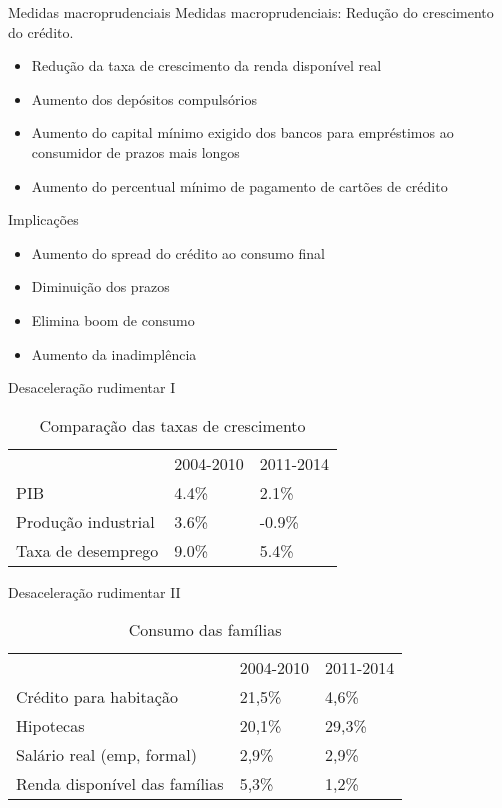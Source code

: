 \documentclass[presentation]{beamer}
\begin{document}
\begin{frame}[label={sec:orga8bc420}]{Medidas macroprudenciais}
\alert{Medidas macroprudenciais:} Redução do crescimento do crédito.

\begin{itemize}
\item Redução da taxa de crescimento da renda disponível real
\item Aumento dos depósitos compulsórios
\item Aumento do capital mínimo exigido dos bancos para empréstimos ao consumidor de prazos mais longos
\item Aumento do percentual mínimo de pagamento de cartões de crédito
\end{itemize}

\begin{block}{Implicações}
\begin{itemize}
\item Aumento do spread do crédito ao consumo final
\item Diminuição dos prazos
\item Elimina \alert{boom} de consumo
\item Aumento da inadimplência
\end{itemize}
\end{block}
\end{frame}


\begin{frame}[label={sec:orga3cb664}]{Desaceleração rudimentar I}
\begin{table}[htbp]
\caption{Comparação das taxas de crescimento}
\centering
\begin{tabular}{lll}
\hline
 & 2004-2010 & 2011-2014\\
PIB & 4.4\% & 2.1\%\\
Produção industrial & 3.6\% & -0.9\%\\
Taxa de desemprego & 9.0\% & 5.4\%\\
\hline
\end{tabular}
\end{table}
\end{frame}


\begin{frame}[label={sec:org36ec198}]{Desaceleração rudimentar II}
\begin{table}[htbp]
\caption{Consumo das famílias}
\centering
\begin{tabular}{lll}
\hline
 & 2004-2010 & 2011-2014\\
Crédito para habitação & 21,5\% & 4,6\%\\
Hipotecas & 20,1\% & 29,3\%\\
Salário real (emp, formal) & 2,9\% & 2,9\%\\
Renda disponível das famílias & 5,3\% & 1,2\%\\
\hline
\end{tabular}
\end{table}
\end{frame}
\end{document}
